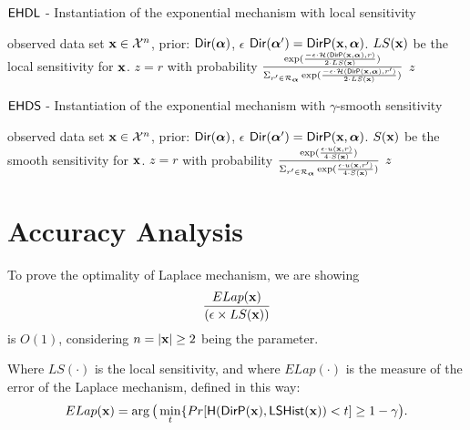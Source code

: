 \documentclass{article}
\begin{document}
%
%
%
%
%
  \begin{algorithm}
  \caption{$\mathsf{EHDL}$ - Instantiation
	of the exponential mechanism with local sensitivity}
  \label{mech:lexpmech}
  \begin{algorithmic}
   observed data set $\textbf{x} \in \mathcal{X}^n$, prior: $\mathsf{Dir}(\boldsymbol{\alpha})$, $\epsilon$
  \STATE {} $\mathsf{Dir}(\boldsymbol{\alpha}')= \mathsf{DirP}(\textbf{x},\boldsymbol{\alpha})$.
  \STATE {} $LS(\textbf{x})$ be the local sensitivity for $\textbf{x}$.
  \STATE {} $z=r$ with probability $\frac
  {\exp(\frac{-\epsilon\cdot \mathcal{H}(\mathsf{DirP}(\textbf{x},\boldsymbol{\alpha}), r)}{2\cdot LS(\textbf{x})})}
{\Sigma_{r' \in \mathcal{R}_{\boldsymbol{\alpha}}}\exp(\frac{-\epsilon\cdot \mathcal{H}(\mathsf{DirP}(\textbf{x},\boldsymbol{\alpha}), r')}{2\cdot LS(\textbf{x})})}$
 $z$
  \end{algorithmic}
  \end{algorithm}
%
%
  \begin{algorithm}
  \caption{$\mathsf{EHDS}$ - Instantiation
	of the exponential mechanism with $\gamma$-smooth sensitivity}
  \label{mech:sexpmech}
  \begin{algorithmic}
  \STATE observed data set $\textbf{x} \in \mathcal{X}^n$, prior: $\mathsf{Dir}(\boldsymbol{\alpha})$, $\epsilon$
  \STATE {} $\mathsf{Dir}(\boldsymbol{\alpha}')= \mathsf{DirP}(\textbf{x},\boldsymbol{\alpha})$.   
  \STATE {} $S(\textbf{x})$ be the smooth sensitivity for $\textbf{x}$.
  \STATE {} $z=r$ with probability $\frac{\exp(\frac{\epsilon\cdot u(\textbf{x}, {r})}{4\cdot S(\textbf{x})})}{\Sigma_{r' \in \mathcal{R}_{\boldsymbol{\alpha}}}\exp(\frac{\epsilon\cdot u(\textbf{x}, r')}{4\cdot S(\textbf{x})})}$
 $z$
  \end{algorithmic}
\end{algorithm}



\clearpage
\section{Accuracy Analysis}
{\color{red}
\begin{thm}
To prove the optimality of Laplace mechanism, we are showing 
\[
\frac{ELap(\textbf{x})}{(\epsilon \times LS(\textbf{x}))}
\]
is {\color{red}$O(1)$}, considering $n=|\textbf{x}| \geq 2$ being the parameter.

Where $LS(\cdot)$ is the local sensitivity, and where $ELap(\cdot)$ is the measure of the error of the Laplace mechanism, defined in this way:
 \[
ELap(\textbf{x}) = \arg\big( \min\limits_{t}\{Pr[\mathsf{H}(\mathsf{DirP}(\textbf{x}), \mathsf{LSHist}(\textbf{x}))< t] \geq 1 - \gamma \big).
\]
\end{thm}
}
\end{document}
